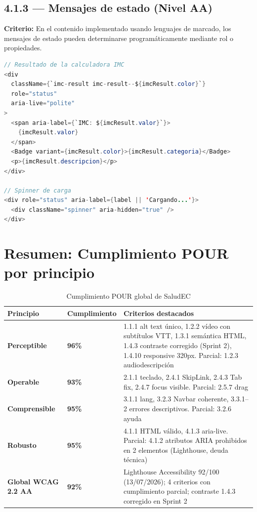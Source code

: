 \documentclass[12pt, a4paper]{article}
\begin{document}
\subsection{4.1.3 --- Mensajes de estado (Nivel AA)}

\textbf{Criterio:} En el contenido implementado usando lenguajes de marcado, los mensajes de estado pueden determinarse programáticamente mediante rol o propiedades.

\begin{evidbox}
\begin{lstlisting}[language=Java]
// Resultado de la calculadora IMC
<div
  className={`imc-result imc-result--${imcResult.color}`}
  role="status"
  aria-live="polite"
>
  <span aria-label={`IMC: ${imcResult.valor}`}>
    {imcResult.valor}
  </span>
  <Badge variant={imcResult.color}>{imcResult.categoria}</Badge>
  <p>{imcResult.descripcion}</p>
</div>

// Spinner de carga
<div role="status" aria-label={label || 'Cargando...'}>
  <div className="spinner" aria-hidden="true" />
</div>
\end{lstlisting}
\end{evidbox}

\section{Resumen: Cumplimiento POUR por principio}

\begin{table}[H]
\centering
\caption{Cumplimiento POUR global de SaludEC}
\begin{tabular}{@{}>{\bfseries\color{navydeep}}p{3cm} >{\centering\arraybackslash}p{2.5cm} p{8cm}@{}}
\toprule
\rowcolor{royalblue!12}
\textbf{Principio} & \textbf{Cumplimiento} & \textbf{Criterios destacados} \\
\midrule
Perceptible & \textcolor{successgreen}{\bfseries 96\%} & 1.1.1 alt text único, 1.2.2 vídeo con subtítulos VTT, 1.3.1 semántica HTML, 1.4.3 contraste corregido (Sprint 2), 1.4.10 responsive 320px. Parcial: 1.2.3 audiodescripción \\
Operable & \textcolor{successgreen}{\bfseries 93\%} & 2.1.1 teclado, 2.4.1 SkipLink, 2.4.3 Tab fix, 2.4.7 focus visible. Parcial: 2.5.7 drag \\
Comprensible & \textcolor{successgreen}{\bfseries 95\%} & 3.1.1 lang, 3.2.3 Navbar coherente, 3.3.1--2 errores descriptivos. Parcial: 3.2.6 ayuda \\
Robusto & \textcolor{warningyellow}{\bfseries 95\%} & 4.1.1 HTML válido, 4.1.3 aria-live. Parcial: 4.1.2 atributos ARIA prohibidos en 2 elementos (Lighthouse, deuda técnica) \\
\midrule
\textbf{Global WCAG 2.2 AA} & \textcolor{warningyellow}{\bfseries 92\%} & Lighthouse Accessibility 92/100 (13/07/2026); 4 criterios con cumplimiento parcial; contraste 1.4.3 corregido en Sprint 2 \\
\bottomrule
\end{tabular}
\end{table}
\end{document}
